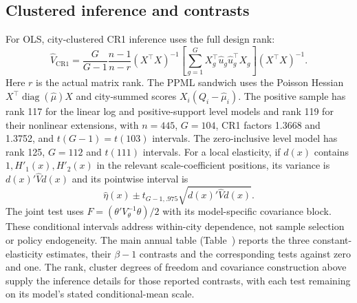 \subsection{Clustered inference and contrasts}
For OLS, city-clustered CR1 inference uses the full design rank:
\begin{equation}
 \widehat V_{\mathrm{CR1}}=
 \frac{G}{G-1}\frac{n-1}{n-r}
 (X^\top X)^{-1}
 \left[\sum_{g=1}^{G}X_g^\top\hat u_g\hat u_g^\top X_g\right]
 (X^\top X)^{-1}.
 \label{eq:si-cr1-ols}
\end{equation}
Here $r$ is the actual matrix rank.  The PPML sandwich uses the Poisson
Hessian $X^\top\operatorname{diag}(\hat\mu)X$ and city-summed scores
$X_i(Q_i-\hat\mu_i)$.  The positive sample has rank 117 for the linear log and
positive-support level models and rank 119 for their nonlinear extensions, with
$n=445$, $G=104$, CR1 factors 1.3668 and 1.3752, and $t(G-1)=t(103)$
intervals.  The zero-inclusive level model has rank 125, $G=112$ and
$t(111)$ intervals.  For a local elasticity, if $d(x)$ contains
$1,H'_1(x),H'_2(x)$ in the relevant scale-coefficient positions, its variance
is $d(x)'\widehat Vd(x)$ and its pointwise interval is
\[
 \hat\eta(x)\mathbin{\pm}t_{G-1,.975}\sqrt{d(x)'\widehat Vd(x)}.
\]
The joint test uses $F=(\theta'V_\theta^{-1}\theta)/2$ with its
model-specific covariance block.  These conditional intervals address
within-city dependence, not sample selection or policy endogeneity.
The main annual table (Table~) reports the three
constant-elasticity estimates, their $\beta-1$ contrasts and the corresponding
tests against zero and one.  The rank, cluster degrees of freedom and
covariance construction above supply the inference details for those reported
contrasts, with each test remaining on its model's stated conditional-mean scale.
